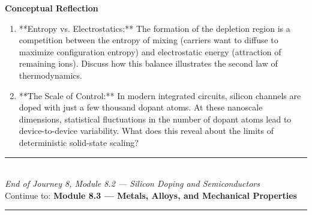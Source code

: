 \documentclass[12pt, a4paper]{book}
\begin{document}
\begin{reflectionbox}
\textbf{Conceptual Reflection}

\begin{enumerate}
  \item **Entropy vs. Electrostatics:** The formation of the depletion region is a competition between the entropy of mixing (carriers want to diffuse to maximize configuration entropy) and electrostatic energy (attraction of remaining ions). Discuss how this balance illustrates the second law of thermodynamics.
  \item **The Scale of Control:** In modern integrated circuits, silicon channels are doped with just a few thousand dopant atoms. At these nanoscale dimensions, statistical fluctuations in the number of dopant atoms lead to device-to-device variability. What does this reveal about the limits of deterministic solid-state scaling?
\end{enumerate}
\end{reflectionbox}

\vspace{1.4cm}
\begin{center}
{\color{JourneyColor}\rule{0.5\linewidth}{0.8pt}}\\[6pt]
{\small\color{JourneyColor}\textit{End of Journey 8, Module 8.2 --- Silicon Doping and Semiconductors}}\\[4pt]
{\small\color{JourneyColor}Continue to: \textbf{Module 8.3 --- Metals, Alloys, and Mechanical Properties}}\\[6pt]
{\color{JourneyColor}\rule{0.5\linewidth}{0.8pt}}
\end{center}
\end{document}
